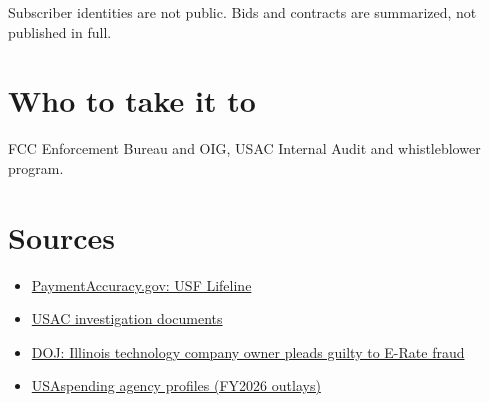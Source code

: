 \documentclass[letterpaper,11pt]{article}
\providecommand{\tightlist}{\setlength{\itemsep}{0pt}\setlength{\parskip}{0pt}}
\begin{document}
Subscriber identities are not public. Bids and contracts are summarized,
not published in full.

\hypertarget{who-to-take-it-to}{%
\section{Who to take it to}\label{who-to-take-it-to}}

FCC Enforcement Bureau and OIG, USAC Internal Audit and whistleblower
program.

\hypertarget{sources}{%
\section{Sources}\label{sources}}

\begin{itemize}
\tightlist
\item
  \href{https://paymentaccuracy.gov/program/fcc-universal-service-fund-lifeline}{PaymentAccuracy.gov:
  USF Lifeline}
\item
  \href{https://www.usac.org/about/contact-usac/submit-a-whistleblower-alert/investigation-documents/}{USAC
  investigation documents}
\item
  \href{https://www.justice.gov/opa/pr/owner-illinois-technology-company-pleads-guilty-scheme-defraud-federal-e-rate-program}{DOJ:
  Illinois technology company owner pleads guilty to E-Rate fraud}
\item
  \href{https://www.usaspending.gov/agency}{USAspending agency profiles
  (FY2026 outlays)}
\end{itemize}
\end{document}
